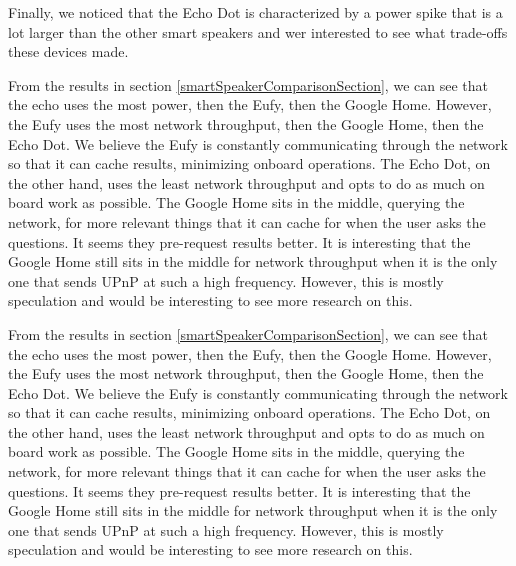 Finally, we noticed that the Echo Dot is characterized by a power spike that is a lot larger than the other smart speakers and wer interested to see what trade-offs these devices made.

From the results in section \ref{smartSpeakerComparisonSection}, we can see that the echo uses the most power, then the Eufy, then the Google Home. However, the Eufy uses the most network throughput, then the Google Home, then the Echo Dot. We believe the Eufy is constantly communicating through the network so that it can cache results, minimizing onboard operations. The Echo Dot, on the other hand, uses the least network throughput and opts to do as much on board work as possible. The Google Home sits in the middle, querying the network, for more relevant things that it can cache for when the user asks the questions. It seems they pre-request results better. It is interesting that the Google Home still sits in the middle for network throughput when it is the only one that sends UPnP at such a high frequency. However, this is mostly speculation and would be interesting to see more research on this.

From the results in section \ref{smartSpeakerComparisonSection}, we can see that the echo uses the most power, then the Eufy, then the Google Home. However, the Eufy uses the most network throughput, then the Google Home, then the Echo Dot. We believe the Eufy is constantly communicating through the network so that it can cache results, minimizing onboard operations. The Echo Dot, on the other hand, uses the least network throughput and opts to do as much on board work as possible. The Google Home sits in the middle, querying the network, for more relevant things that it can cache for when the user asks the questions. It seems they pre-request results better. It is interesting that the Google Home still sits in the middle for network throughput when it is the only one that sends UPnP at such a high frequency. However, this is mostly speculation and would be interesting to see more research on this.